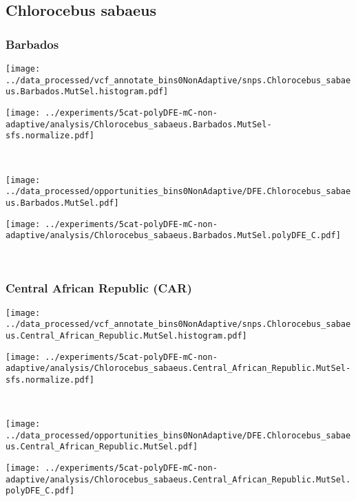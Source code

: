 \subsection{Chlorocebus sabaeus}

\subsubsection{Barbados}

\begin{minipage}{0.49\linewidth}
    \texttt{[image: ../data\_processed/vcf\_annotate\_bins0NonAdaptive/snps.Chlorocebus\_sabaeus.Barbados.MutSel.histogram.pdf]}
\end{minipage}
\begin{minipage}{0.49\linewidth}
    \texttt{[image: ../experiments/5cat-polyDFE-mC-non-adaptive/analysis/Chlorocebus\_sabaeus.Barbados.MutSel-sfs.normalize.pdf]}
\end{minipage}
\\
\begin{minipage}{0.49\linewidth}
    \texttt{[image: ../data\_processed/opportunities\_bins0NonAdaptive/DFE.Chlorocebus\_sabaeus.Barbados.MutSel.pdf]}
\end{minipage}
\begin{minipage}{0.49\linewidth}
    \texttt{[image: ../experiments/5cat-polyDFE-mC-non-adaptive/analysis/Chlorocebus\_sabaeus.Barbados.MutSel.polyDFE\_C.pdf]}
\end{minipage}
\\

\subsubsection{Central African Republic (CAR)}

\begin{minipage}{0.49\linewidth}
    \texttt{[image: ../data\_processed/vcf\_annotate\_bins0NonAdaptive/snps.Chlorocebus\_sabaeus.Central\_African\_Republic.MutSel.histogram.pdf]}
\end{minipage}
\begin{minipage}{0.49\linewidth}
    \texttt{[image: ../experiments/5cat-polyDFE-mC-non-adaptive/analysis/Chlorocebus\_sabaeus.Central\_African\_Republic.MutSel-sfs.normalize.pdf]}
\end{minipage}
\\
\begin{minipage}{0.49\linewidth}
    \texttt{[image: ../data\_processed/opportunities\_bins0NonAdaptive/DFE.Chlorocebus\_sabaeus.Central\_African\_Republic.MutSel.pdf]}
\end{minipage}
\begin{minipage}{0.49\linewidth}
    \texttt{[image: ../experiments/5cat-polyDFE-mC-non-adaptive/analysis/Chlorocebus\_sabaeus.Central\_African\_Republic.MutSel.polyDFE\_C.pdf]}
\end{minipage}
\\

